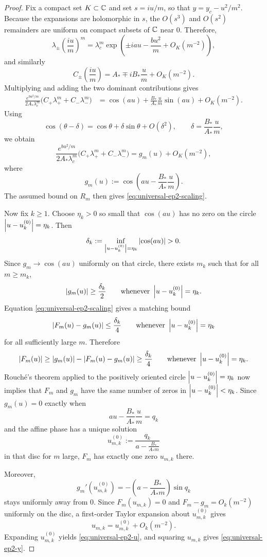 \begin{proof}
Fix a compact set \(K\subset\mathbb{C}\) and set \(s=iu/m\), so that \(y=y_c-u^2/m^2\).
Because the expansions are holomorphic in \(s\), the \(O(s^3)\) and \(O(s^2)\) remainders are uniform on compact subsets of \(\mathbb{C}\) near \(0\).
Therefore,
\[
\lambda_\pm\!\left(\frac{iu}{m}\right)^m
=
\lambda_c^m
\exp\!\left(
\pm iau-\frac{bu^2}{m}+O_K(m^{-2})
\right),
\]
and similarly
\[
C_\pm\!\left(\frac{iu}{m}\right)
=
A_*\mp iB_*\frac{u}{m}+O_K(m^{-2}).
\]
Multiplying and adding the two dominant contributions gives
\begin{align*}
\frac{e^{b u^2/m}}{2A_*\lambda_c^m}
\bigl(C_+\lambda_+^m + C_-\lambda_-^m\bigr)
&=
\cos(au)+\frac{B_*}{A_*}\frac{u}{m}\sin(au)+O_K(m^{-2}).
\end{align*}
Using
\[
\cos(\theta-\delta)=\cos\theta+\delta\sin\theta+O(\delta^2),
\qquad
\delta=\frac{B_*}{A_*}\frac{u}{m},
\]
we obtain
\[
\frac{e^{b u^2/m}}{2A_*\lambda_c^m}
\bigl(C_+\lambda_+^m + C_-\lambda_-^m\bigr)
=
g_m(u)+O_K(m^{-2}),
\]
where
\[
g_m(u):=\cos\!\left(a u-\frac{B_*}{A_*}\frac{u}{m}\right).
\]
The assumed bound on \(R_m\) then gives \eqref{eq:universal-ep2-scaling}.

Now fix \(k\ge1\).
Choose \(\eta_k>0\) so small that \(\cos(au)\) has no zero on the circle \(\left\lvert u-u_k^{(0)}\right\rvert=\eta_k\).
Then
\[
\delta_k:=\inf_{\left\lvert u-u_k^{(0)}\right\rvert=\eta_k}\left\lvert \cos(au)\right\rvert>0.
\]
Since \(g_m\to \cos(au)\) uniformly on that circle, there exists \(m_k\) such that for all \(m\ge m_k\),
\[
\left\lvert g_m(u)\right\rvert\ge \frac{\delta_k}{2}
\qquad
\text{whenever }\left\lvert u-u_k^{(0)}\right\rvert=\eta_k.
\]
Equation \eqref{eq:universal-ep2-scaling} gives a matching bound
\[
\left\lvert F_m(u)-g_m(u)\right\rvert\le \frac{\delta_k}{4}
\qquad
\text{whenever }\left\lvert u-u_k^{(0)}\right\rvert=\eta_k
\]
for all sufficiently large \(m\).
Therefore
\[
\left\lvert F_m(u)\right\rvert\ge \left\lvert g_m(u)\right\rvert-\left\lvert F_m(u)-g_m(u)\right\rvert\ge \frac{\delta_k}{4}
\qquad
\text{whenever }\left\lvert u-u_k^{(0)}\right\rvert=\eta_k.
\]
Rouch\'e's theorem applied to the positively oriented circle \(\left\lvert u-u_k^{(0)}\right\rvert=\eta_k\) now implies that \(F_m\) and \(g_m\) have the same number of zeros in \(\left\lvert u-u_k^{(0)}\right\rvert<\eta_k\).
Since \(g_m(u)=0\) exactly when
\[
au-\frac{B_*}{A_*}\frac{u}{m}=q_k
\]
and the affine phase has a unique solution
\[
u_{m,k}^{(0)}:=\frac{q_k}{a-\frac{B_*}{A_*m}}
\]
in that disc for \(m\) large, \(F_m\) has exactly one zero \(u_{m,k}\) there.

Moreover,
\[
g_m'(u_{m,k}^{(0)})
=
-\left(a-\frac{B_*}{A_*m}\right)\sin q_k
\]
stays uniformly away from \(0\).
Since \(F_m(u_{m,k})=0\) and \(F_m-g_m=O_k(m^{-2})\) uniformly on the disc, a first-order Taylor expansion about \(u_{m,k}^{(0)}\) gives
\[
u_{m,k}=u_{m,k}^{(0)}+O_k(m^{-2}).
\]
Expanding \(u_{m,k}^{(0)}\) yields \eqref{eq:universal-ep2-u}, and squaring \(u_{m,k}\) gives \eqref{eq:universal-ep2-y}.
\end{proof}

